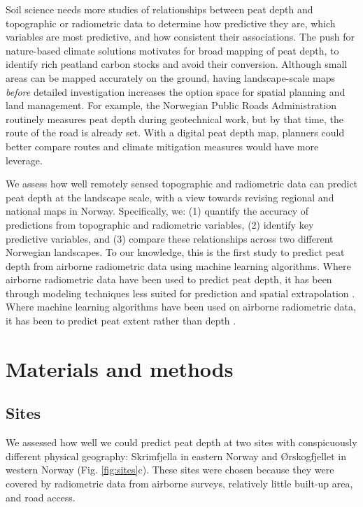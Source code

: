 \documentclass[soil, manuscript]{copernicus}
\begin{document}
Soil science needs more studies of relationships between peat depth and topographic or radiometric data to determine how predictive they are, which variables are most predictive, and how consistent their associations.
The push for nature-based climate solutions motivates for broad mapping of peat depth, to identify rich peatland carbon stocks and avoid their conversion.
Although small areas can be mapped accurately on the ground, having landscape-scale maps \emph{before} detailed investigation increases the option space for spatial planning and land management.
For example, the Norwegian Public Roads Administration routinely measures peat depth during geotechnical work, but by that time, the route of the road is already set.
With a digital peat depth map, planners could better compare routes and climate mitigation measures would have more leverage.

We assess how well remotely sensed topographic and radiometric data can predict peat depth at the landscape scale, with a view towards revising regional and national maps in Norway.
Specifically, we: (1) quantify the accuracy of predictions from topographic and radiometric variables, (2) identify key predictive variables, and (3) compare these relationships across two different Norwegian landscapes.
To our knowledge, this is the first study to predict peat depth from airborne radiometric data using machine learning algorithms.
Where airborne radiometric data have been used to predict peat depth, it has been through modeling techniques less suited for prediction and spatial extrapolation \citep[e.g.,][]{keaneySpatialStatisticsEstimate2013, gatisMappingUplandPeat2019, siemonAirborneElectromagneticRadiometric2020}.
Where machine learning algorithms have been used on airborne radiometric data, it has been to predict peat extent rather than depth \citep[e.g.,][]{olearyDigitalSoilMapping2022}.

\section{Materials and methods}

\subsection{Sites}

We assessed how well we could predict peat depth at two sites with conspicuously different physical geography: Skrimfjella in eastern Norway and Ørskogfjellet in western Norway (Fig. \ref{fig:sites}c).
These sites were chosen because they were covered by radiometric data from airborne surveys, relatively little built-up area, and road access.
\end{document}
